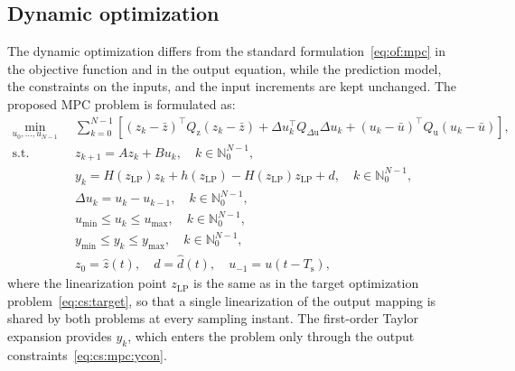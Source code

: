 \documentclass[preprint,12pt,authoryear]{elsarticle}
\theoremstyle{remark}
\newcommand{\ui}[2]{#1_{\text{#2}}}
\begin{document}
\subsection{Dynamic optimization}
\label{sec:method:mpc}
The dynamic optimization differs from the standard formulation~\eqref{eq:of:mpc} in the objective function and in the output equation, while the prediction model, the constraints on the inputs, and the input increments are kept unchanged.
The proposed MPC problem is formulated as:
\begin{subequations}
  \label{eq:cs:mpc}
  \begin{align}
    \min_{u_0, \ldots, u_{N-1}} \; & \; \sum_{k=0}^{N-1} \left[ (z_k - \bar{z})^\intercal Q_\text{z} (z_k - \bar{z}) + \Delta u_k^\intercal Q_{\Delta\text{u}} \Delta u_k + (u_k - \bar{u})^\intercal Q_\text{u} (u_k - \bar{u}) \right], \label{eq:cs:mpc:obj} \\
    \text{s.t.}\;\;\;\; & \; z_{k+1} = A z_k + B u_k, \quad k\in\mathbb{N}_0^{N-1}, \label{eq:cs:mpc:z} \\
    & \; y_k = H(\ui{z}{LP}) z_k + h(\ui{z}{LP}) - H(\ui{z}{LP})\ui{z}{LP} + d, \quad k\in\mathbb{N}_0^{N-1}, \label{eq:cs:mpc:y} \\
    & \; \Delta u_k = u_k - u_{k-1}, \quad k\in\mathbb{N}_0^{N-1}, \label{eq:cs:mpc:du} \\
    & \; u_{\min} \leq u_k \leq u_{\max}, \quad k\in\mathbb{N}_0^{N-1}, \label{eq:cs:mpc:u} \\
    & \; y_{\min} \leq y_k \leq y_{\max}, \quad k\in\mathbb{N}_0^{N-1}, \label{eq:cs:mpc:ycon} \\
    & \; z_0 = \hat{z}(t), \quad d = \hat{d}(t), \quad u_{-1} = u(t-T_\text{s}), \label{eq:cs:mpc:init}
  \end{align}
\end{subequations}
where the linearization point \(\ui{z}{LP}\) is the same as in the target optimization problem~\eqref{eq:cs:target}, so that a single linearization of the output mapping is shared by both problems at every sampling instant. The first-order Taylor expansion provides \(y_k\), which enters the problem only through the output constraints~\eqref{eq:cs:mpc:ycon}. 
\end{document}
